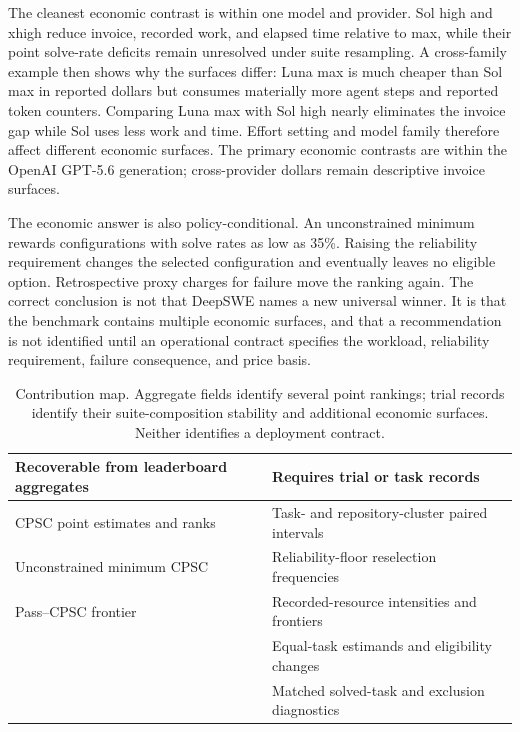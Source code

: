 \documentclass[11pt]{article}
\begin{document}
The cleanest economic contrast is within one model and provider. Sol high and xhigh reduce invoice,
recorded work, and elapsed time relative to max, while their point solve-rate deficits remain
unresolved under suite resampling. A cross-family example then shows why the surfaces differ: Luna
max is much cheaper than Sol max in reported dollars but consumes materially more agent steps and
reported token counters. Comparing Luna max with Sol high nearly eliminates the invoice gap while
Sol uses less work and time. Effort setting and model family therefore affect different economic
surfaces. The primary economic contrasts are within the OpenAI GPT-5.6 generation; cross-provider
dollars remain descriptive invoice surfaces.

The economic answer is also policy-conditional. An unconstrained minimum rewards configurations
with solve rates as low as 35\%. Raising the reliability requirement changes the selected
configuration and eventually leaves no eligible option. Retrospective proxy charges for failure
move the ranking again. The correct conclusion is not that DeepSWE names a new universal winner.
It is that the benchmark contains multiple economic surfaces, and that a recommendation is not
identified until an operational contract specifies the workload, reliability requirement, failure
consequence, and price basis.

\begin{table}[t]
\centering
\small
\caption{Contribution map. Aggregate fields identify several point rankings; trial records identify
their suite-composition stability and additional economic surfaces. Neither identifies a deployment
contract.}
\label{tab:contribution-map}
\begin{tabularx}{\textwidth}{@{}XX@{}}
\toprule
Recoverable from leaderboard aggregates & Requires trial or task records \\
\midrule
CPSC point estimates and ranks & Task- and repository-cluster paired intervals \\
Unconstrained minimum CPSC & Reliability-floor reselection frequencies \\
Pass--CPSC frontier & Recorded-resource intensities and frontiers \\
 & Equal-task estimands and eligibility changes \\
 & Matched solved-task and exclusion diagnostics \\
\bottomrule
\end{tabularx}
\end{table}
\end{document}
